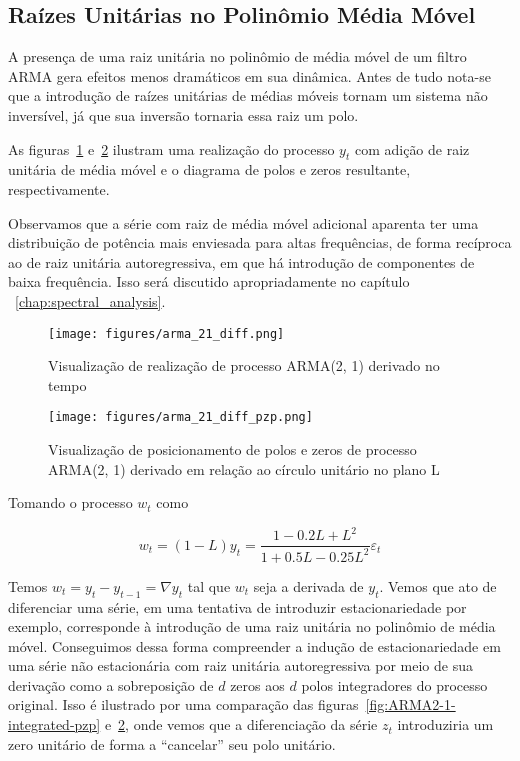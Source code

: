 \subsection{Raízes Unitárias no Polinômio Média Móvel}\label{ssec:ma_roots}

A presença de uma raiz unitária no polinômio de média móvel de um filtro ARMA
gera efeitos menos dramáticos em sua dinâmica. Antes de tudo nota-se que a
introdução de raízes unitárias de médias móveis tornam um sistema não
inversível, já que sua inversão  tornaria essa raiz um polo.

As figuras~\ref{fig:ARMA2-1-diff} e~\ref{fig:ARMA2-1-diff-pzp} ilustram uma
realização do processo $y_t$ com adição de raiz unitária de média móvel e o
diagrama de polos e zeros resultante, respectivamente.

Observamos que a série com raiz de média móvel adicional aparenta ter uma
distribuição de potência mais enviesada para altas frequências, de forma
recíproca ao de raiz unitária autoregressiva, em que há introdução de
componentes de baixa frequência. Isso será discutido apropriadamente no
capítulo ~\ref{chap:spectral_analysis}.

\begin{figure}[H]
    \centering
    \texttt{[image: figures/arma\_21\_diff.png]}
    \caption{Visualização de realização de processo ARMA(2, 1) derivado
    no tempo}
    \label{fig:ARMA2-1-diff}
\end{figure}

\begin{figure}[H]
    \centering
    \texttt{[image: figures/arma\_21\_diff\_pzp.png]}
    \caption{Visualização de posicionamento de polos e zeros de processo
    ARMA(2, 1) derivado em relação ao círculo unitário no plano L}
    \label{fig:ARMA2-1-diff-pzp}
\end{figure}

Tomando o processo $w_t$ como

$$ w_t = (1 - L)y_t = \frac{1 - 0.2L + L^2}{1 + 0.5L - 0.25L^2}\varepsilon_t$$

Temos $w_t = y_t - y_{t-1} = \nabla y_t$ tal que $w_t$ seja a derivada de
$y_t$. Vemos que ato de diferenciar uma série, em uma tentativa de introduzir
estacionariedade por exemplo, corresponde à introdução de uma raiz unitária no
polinômio de média móvel. Conseguimos dessa forma compreender a indução de
estacionariedade em uma série não estacionária com raiz unitária autoregressiva
por meio de sua derivação como a sobreposição de $d$ zeros aos $d$ polos
integradores do processo original. Isso é ilustrado por uma comparação das
figuras~\ref{fig:ARMA2-1-integrated-pzp} e~\ref{fig:ARMA2-1-diff-pzp}, onde
vemos que a diferenciação da série $z_t$ introduziria um zero unitário de forma
a ``cancelar'' seu polo unitário.

